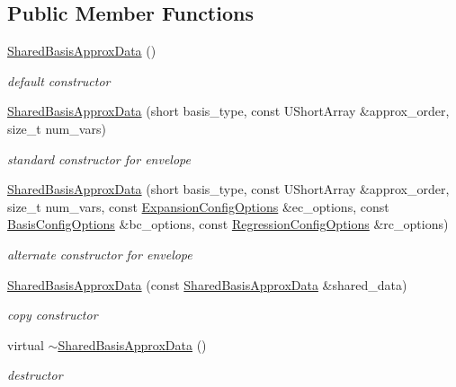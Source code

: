\subsection*{Public Member Functions}
\begin{DoxyCompactItemize}
\item 
\hyperlink{classPecos_1_1SharedBasisApproxData_a2810f392a8f5e07c7d163e3a63dbc842}{Shared\+Basis\+Approx\+Data} ()
\begin{DoxyCompactList}\small\item\em default constructor \end{DoxyCompactList}\item 
\hyperlink{classPecos_1_1SharedBasisApproxData_a2560e30cc6375ea283da16e0098f21fc}{Shared\+Basis\+Approx\+Data} (short basis\+\_\+type, const U\+Short\+Array \&approx\+\_\+order, size\+\_\+t num\+\_\+vars)
\begin{DoxyCompactList}\small\item\em standard constructor for envelope \end{DoxyCompactList}\item 
\hyperlink{classPecos_1_1SharedBasisApproxData_affb150743bae8de01873504c4e925cc1}{Shared\+Basis\+Approx\+Data} (short basis\+\_\+type, const U\+Short\+Array \&approx\+\_\+order, size\+\_\+t num\+\_\+vars, const \hyperlink{classPecos_1_1ExpansionConfigOptions}{Expansion\+Config\+Options} \&ec\+\_\+options, const \hyperlink{classPecos_1_1BasisConfigOptions}{Basis\+Config\+Options} \&bc\+\_\+options, const \hyperlink{classPecos_1_1RegressionConfigOptions}{Regression\+Config\+Options} \&rc\+\_\+options)
\begin{DoxyCompactList}\small\item\em alternate constructor for envelope \end{DoxyCompactList}\item 
\hyperlink{classPecos_1_1SharedBasisApproxData_aa860c6fdd67a7b1aa8a691f71c1d53db}{Shared\+Basis\+Approx\+Data} (const \hyperlink{classPecos_1_1SharedBasisApproxData}{Shared\+Basis\+Approx\+Data} \&shared\+\_\+data)
\begin{DoxyCompactList}\small\item\em copy constructor \end{DoxyCompactList}\item 
virtual \hyperlink{classPecos_1_1SharedBasisApproxData_aa327dbd55bffbb72910a1f7d336c8a6d}{$\sim$\+Shared\+Basis\+Approx\+Data} ()
\begin{DoxyCompactList}\small\item\em destructor \end{DoxyCompactList}\item 

\end{DoxyCompactItemize}
